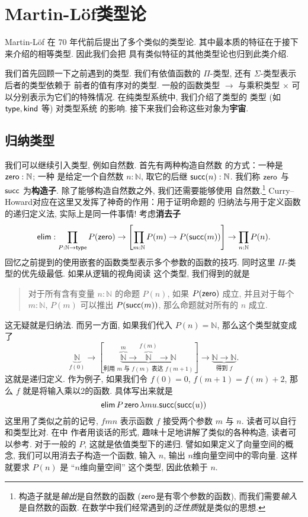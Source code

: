 \chapter{Martin-L\"of类型论}\label{martinlof}

Martin-L\"of 在 70 年代前后提出了多个类似的类型论.
其中最本质的特征在于接下来介绍的相等类型. 因此我们会把
具有类似特征的其他类型论也归到此类介绍.

我们首先回顾一下之前遇到的类型. 我们有依值函数的
\(\Pi\)-类型, 还有 \(\Sigma\)-类型表示后者的类型依赖于
前者的值有序对的类型. 一般的函数类型 \(\to\) 与乘积类型
\(\times\) 可以分别表示为它们的特殊情况.
在纯类型系统中, 我们介绍了类型的
类型 (如 \(\textsf{type}, \textsf{kind}\) 等) 对类型系统
的影响. 接下来我们会称这些对象为\textbf{宇宙}.

\section{归纳类型}

我们可以继续引入类型, 例如自然数. 首先有两种构造自然数
的方式：一种是 \(\textsf{zero} : \mathbb N\); 一种
是给定一个自然数 \(n : \mathbb N\), 取它的后继
\(\textsf{succ}(n) : \mathbb N\). 我们称
\(\textsf{zero}\) 与 \(\textsf{succ}\) 为\textbf{构造子}.
除了能够构造自然数之外, 我们还需要能够使用
自然数.\footnote{构造子就是\emph{输出}是自然数的函数
(\(\textsf{zero}\)是有零个参数的函数), 而我们需要\emph{输入}是自然数的函数.
在数学中我们经常遇到的\emph{泛性质}就是类似的思想.}
Curry--Howard对应在这里又发挥了神奇的作用：用于证明命题的
归纳法与用于定义函数的递归定义法, 实际上是同一件事情!
考虑\textbf{消去子}
\[\textsf{elim} :
\prod_{P : \mathbb N \to \textsf{type}}
P(\textsf{zero}) \to
\left[\prod_{m : \mathbb N} P(m) \to P(\textsf{succ}(m))\right]
\to \prod_{n : \mathbb N} P(n).\]
回忆之前提到的使用嵌套的函数类型表示多个参数的函数的技巧.
同时这里 \(\Pi\)-类型的优先级最低. 如果从逻辑的视角阅读
这个类型, 我们得到的就是
\begin{quotation}
对于所有含有变量 \(n : \mathbb N\) 的命题 \(P(n)\),
如果 \(P(\textsf{zero})\) 成立, 并且对于每个
\(m : \mathbb N\), \(P(m)\) 可以推出 \(P(\textsf{succ}(m))\),
那么命题就对所有的 \(n\) 成立.
\end{quotation}
这无疑就是归纳法. 而另一方面, 如果我们代入 \(P(n) = \mathbb N\),
那么这个类型就变成了
\[\underbrace{\mathbb N}_{f(0)} \to
[\underbrace{\overbrace{\mathbb N}^{m} \to \overbrace{\mathbb N}^{f(m)} \to \mathbb N}
_{\text{利用 \(m\) 与 \(f(m)\) 表达 \(f(m+1)\)}}] \to
\underbrace{\mathbb N \to \mathbb N}_{\text{得到 \(f\)}}.\]
这就是递归定义. 作为例子, 如果我们令
\(f(0) = 0\), \(f(m+1) = f(m)+2\), 那么
\(f\) 就是将输入乘以\(2\)的函数. 具体写出来就是
\[\textsf{elim}\, P\,\textsf{zero}\,\lambda m u. \textsf{succ}(\textsf{succ}(u))\]
这里用了类似之前的记号, \(fmn\) 表示函数 \(f\) 接受两个参数 \(m\) 与 \(n\).
读者可以自行和类型比对. 在\cite{friedman:2018:typer}中
作者用谈话的形式, 趣味十足地讲解了类似的各种构造,
读者可以参考. 对于一般的 \(P\), 这就是依值类型下的递归.
譬如如果定义了向量空间的概念, 我们可以用消去子构造一个函数,
输入 \(n\), 输出 \(n\)维向量空间中的零向量. 这样就要求
\(P(n)\) 是 “\(n\)维向量空间” 这个类型, 因此依赖于 \(n\).

